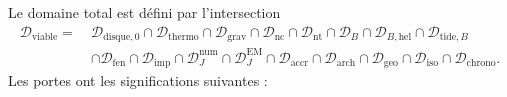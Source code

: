 \documentclass[11pt,a4paper,openany]{report}
\begin{document}
Le domaine total est défini par l'intersection
\begin{equation}
\boxed{\begin{aligned}
\mathcal{D}_{\mathrm{viable}}=\ &\mathcal{D}_{\mathrm{disque},0}\cap\mathcal{D}_{\mathrm{thermo}}
\cap\mathcal{D}_{\mathrm{grav}}\cap\mathcal{D}_{\mathrm{nc}}\cap\mathcal{D}_{\mathrm{nt}}
\cap\mathcal{D}_{B}\cap\mathcal{D}_{B,\mathrm{hel}}\cap\mathcal{D}_{\mathrm{tide},B}\\
&\cap\mathcal{D}_{\mathrm{fen}}\cap\mathcal{D}_{\mathrm{imp}}
\cap\mathcal{D}_{J}^{\mathrm{num}}\cap\mathcal{D}_{J}^{\mathrm{EM}}
\cap\mathcal{D}_{\mathrm{accr}}\cap\mathcal{D}_{\mathrm{arch}}
\cap\mathcal{D}_{\mathrm{geo}}\cap\mathcal{D}_{\mathrm{iso}}\cap\mathcal{D}_{\mathrm{chrono}}.
\end{aligned}}
\label{eq:Dviable}
\end{equation}
Les portes ont les significations suivantes :
\end{document}
